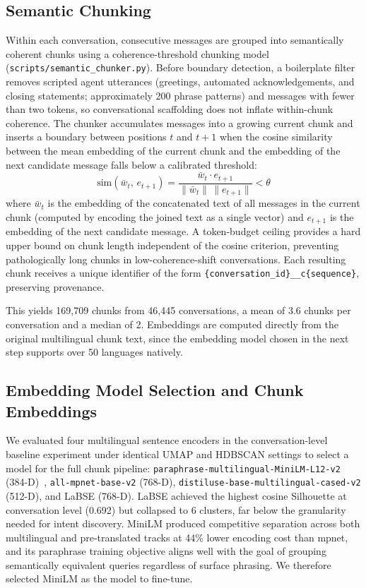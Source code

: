\documentclass[conference]{IEEEtran}
\begin{document}
\subsection{Semantic Chunking}
\label{sec:chunking}

Within each conversation, consecutive messages are grouped into semantically coherent chunks using a coherence-threshold chunking model (\texttt{scripts/semantic\_chunker.py}). Before boundary detection, a boilerplate filter removes scripted agent utterances (greetings, automated acknowledgements, and closing statements; approximately 200 phrase patterns) and messages with fewer than two tokens, so conversational scaffolding does not inflate within-chunk coherence. The chunker accumulates messages into a growing current chunk and inserts a boundary between positions $t$ and $t{+}1$ when the cosine similarity between the mean embedding of the current chunk and the embedding of the next candidate message falls below a calibrated threshold:
\begin{equation}
  \mathrm{sim}(\bar{w}_t,\, e_{t+1})
  = \frac{\bar{w}_t \cdot e_{t+1}}{\|\bar{w}_t\|\,\|e_{t+1}\|}
  < \theta
  \label{eq:chunk}
\end{equation}
where $\bar{w}_t$ is the embedding of the concatenated text of all messages in the current chunk (computed by encoding the joined text as a single vector) and $e_{t+1}$ is the embedding of the next candidate message. A token-budget ceiling provides a hard upper bound on chunk length independent of the cosine criterion, preventing pathologically long chunks in low-coherence-shift conversations. Each resulting chunk receives a unique identifier of the form \texttt{\{conversation\_id\}\_\_c\{sequence\}}, preserving provenance.

This yields 169{,}709 chunks from 46{,}445 conversations, a mean of 3.6 chunks per conversation and a median of 2. Embeddings are computed directly from the original multilingual chunk text, since the embedding model chosen in the next step supports over 50 languages natively.

\subsection{Embedding Model Selection and Chunk Embeddings}

We evaluated four multilingual sentence encoders in the conversation-level baseline experiment under identical UMAP and HDBSCAN settings to select a model for the full chunk pipeline: \texttt{paraphrase-multilingual-MiniLM-L12-v2} (384-D)~\cite{wang2020minilm}, \texttt{all-mpnet-base-v2} (768-D), \texttt{distiluse-base-multilingual-cased-v2} (512-D), and LaBSE (768-D). LaBSE achieved the highest cosine Silhouette at conversation level (0.692) but collapsed to 6 clusters, far below the granularity needed for intent discovery. MiniLM produced competitive separation across both multilingual and pre-translated tracks at 44\% lower encoding cost than mpnet, and its paraphrase training objective aligns well with the goal of grouping semantically equivalent queries regardless of surface phrasing. We therefore selected MiniLM as the model to fine-tune.
\end{document}
